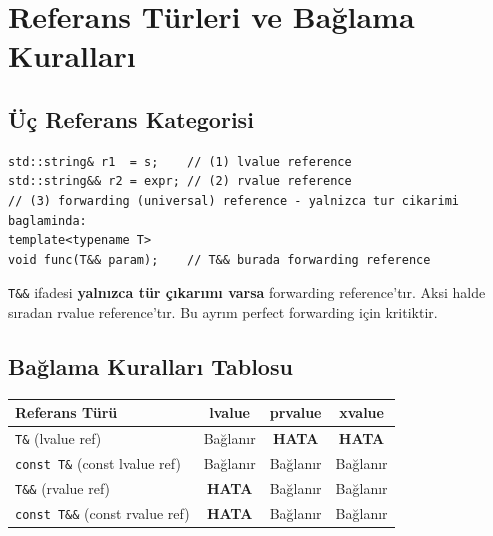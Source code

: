 \documentclass[a4paper,12pt]{article}
\begin{document}
\section{Referans Türleri ve Bağlama Kuralları}

\subsection{Üç Referans Kategorisi}

\begin{lstlisting}
std::string& r1  = s;    // (1) lvalue reference
std::string&& r2 = expr; // (2) rvalue reference
// (3) forwarding (universal) reference - yalnizca tur cikarimi baglaminda:
template<typename T>
void func(T&& param);    // T&& burada forwarding reference
\end{lstlisting}

\begin{notebox}
\texttt{T\&\&} ifadesi \textbf{yalnızca tür çıkarımı varsa} forwarding reference'tır. Aksi halde sıradan rvalue reference'tır. Bu ayrım perfect forwarding için kritiktir.
\end{notebox}

\subsection{Bağlama Kuralları Tablosu}

\begin{table}[h]
\centering
\begin{tabular}{@{}lccc@{}}
\toprule
\textbf{Referans Türü} & \textbf{lvalue} & \textbf{prvalue} & \textbf{xvalue} \\
\midrule
\texttt{T\&} (lvalue ref)             & Bağlanır & \textbf{HATA} & \textbf{HATA} \\
\texttt{const T\&} (const lvalue ref) & Bağlanır & Bağlanır      & Bağlanır \\
\texttt{T\&\&} (rvalue ref)           & \textbf{HATA} & Bağlanır & Bağlanır \\
\texttt{const T\&\&} (const rvalue ref) & \textbf{HATA} & Bağlanır & Bağlanır \\
\bottomrule
\end{tabular}
\end{table}
\end{document}
